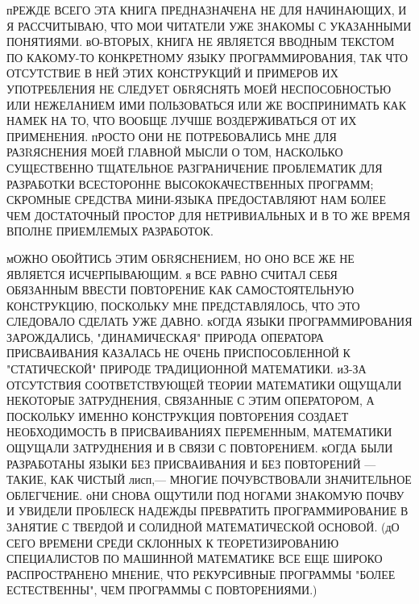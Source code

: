 пРЕЖДЕ ВСЕГО ЭТА КНИГА ПРЕДНАЗНАЧЕНА НЕ ДЛЯ НАЧИНАЮЩИХ, И Я РАССЧИТЫВАЮ, ЧТО 
МОИ ЧИТАТЕЛИ УЖЕ ЗНАКОМЫ С УКАЗАННЫМИ ПОНЯТИЯМИ. вО-ВТОРЫХ, КНИГА НЕ ЯВЛЯЕТСЯ
ВВОДНЫМ ТЕКСТОМ ПО КАКОМУ-ТО КОНКРЕТНОМУ ЯЗЫКУ ПРОГРАММИРОВАНИЯ, ТАК ЧТО 
ОТСУТСТВИЕ В НЕЙ ЭТИХ КОНСТРУКЦИЙ И ПРИМЕРОВ ИХ УПОТРЕБЛЕНИЯ НЕ СЛЕДУЕТ
ОБRЯСНЯТЬ МОЕЙ НЕСПОСОБНОСТЬЮ ИЛИ НЕЖЕЛАНИЕМ ИМИ ПОЛЬЗОВАТЬСЯ ИЛИ ЖЕ 
ВОСПРИНИМАТЬ КАК НАМЕК НА ТО, ЧТО ВООБЩЕ ЛУЧШЕ ВОЗДЕРЖИВАТЬСЯ ОТ ИХ ПРИМЕНЕНИЯ.
пРОСТО ОНИ НЕ ПОТРЕБОВАЛИСЬ МНЕ ДЛЯ РАЗRЯСНЕНИЯ МОЕЙ ГЛАВНОЙ МЫСЛИ О ТОМ, 
НАСКОЛЬКО СУЩЕСТВЕННО ТЩАТЕЛЬНОЕ РАЗГРАНИЧЕНИЕ ПРОБЛЕМАТИК ДЛЯ РАЗРАБОТКИ 
ВСЕСТОРОННЕ ВЫСОКОКАЧЕСТВЕННЫХ ПРОГРАММ; СКРОМНЫЕ СРЕДСТВА МИНИ-ЯЗЫКА
ПРЕДОСТАВЛЯЮТ НАМ БОЛЕЕ ЧЕМ ДОСТАТОЧНЫЙ ПРОСТОР ДЛЯ НЕТРИВИАЛЬНЫХ И В ТО 
ЖЕ ВРЕМЯ ВПОЛНЕ ПРИЕМЛЕМЫХ РАЗРАБОТОК.

мОЖНО ОБОЙТИСЬ ЭТИМ ОБRЯСНЕНИЕМ, НО ОНО ВСЕ ЖЕ НЕ ЯВЛЯЕТСЯ ИСЧЕРПЫВАЮЩИМ. 
я ВСЕ РАВНО СЧИТАЛ СЕБЯ ОБЯЗАННЫМ ВВЕСТИ ПОВТОРЕНИЕ КАК САМОСТОЯТЕЛЬНУЮ
КОНСТРУКЦИЮ, ПОСКОЛЬКУ МНЕ ПРЕДСТАВЛЯЛОСЬ, ЧТО ЭТО СЛЕДОВАЛО СДЕЛАТЬ УЖЕ 
ДАВНО. кОГДА ЯЗЫКИ ПРОГРАММИРОВАНИЯ ЗАРОЖДАЛИСЬ, "ДИНАМИЧЕСКАЯ" ПРИРОДА 
ОПЕРАТОРА ПРИСВАИВАНИЯ КАЗАЛАСЬ НЕ ОЧЕНЬ ПРИСПОСОБЛЕННОЙ К "СТАТИЧЕСКОЙ" 
ПРИРОДЕ ТРАДИЦИОННОЙ МАТЕМАТИКИ.  иЗ-ЗА ОТСУТСТВИЯ СООТВЕТСТВУЮЩЕЙ ТЕОРИИ 
МАТЕМАТИКИ ОЩУЩАЛИ НЕКОТОРЫЕ ЗАТРУДНЕНИЯ, СВЯЗАННЫЕ С ЭТИМ ОПЕРАТОРОМ, 
А ПОСКОЛЬКУ ИМЕННО КОНСТРУКЦИЯ ПОВТОРЕНИЯ СОЗДАЕТ НЕОБХОДИМОСТЬ В 
ПРИСВАИВАНИЯХ ПЕРЕМЕННЫМ, МАТЕМАТИКИ ОЩУЩАЛИ ЗАТРУДНЕНИЯ И В СВЯЗИ С 
ПОВТОРЕНИЕМ. кОГДА БЫЛИ РАЗРАБОТАНЫ ЯЗЫКИ БЕЗ ПРИСВАИВАНИЯ И БЕЗ 
ПОВТОРЕНИЙ --- ТАКИЕ, КАК ЧИСТЫЙ лисп,--- МНОГИЕ ПОЧУВСТВОВАЛИ ЗНАЧИТЕЛЬНОЕ
ОБЛЕГЧЕНИЕ. оНИ СНОВА ОЩУТИЛИ ПОД НОГАМИ ЗНАКОМУЮ ПОЧВУ И УВИДЕЛИ ПРОБЛЕСК 
НАДЕЖДЫ ПРЕВРАТИТЬ ПРОГРАММИРОВАНИЕ В ЗАНЯТИЕ С ТВЕРДОЙ И СОЛИДНОЙ
МАТЕМАТИЧЕСКОЙ ОСНОВОЙ. (дО СЕГО ВРЕМЕНИ СРЕДИ СКЛОННЫХ К ТЕОРЕТИЗИРОВАНИЮ 
СПЕЦИАЛИСТОВ ПО МАШИННОЙ МАТЕМАТИКЕ ВСЕ ЕЩЕ ШИРОКО РАСПРОСТРАНЕНО МНЕНИЕ, 
ЧТО РЕКУРСИВНЫЕ ПРОГРАММЫ "БОЛЕЕ ЕСТЕСТВЕННЫ", ЧЕМ ПРОГРАММЫ С ПОВТОРЕНИЯМИ.)

